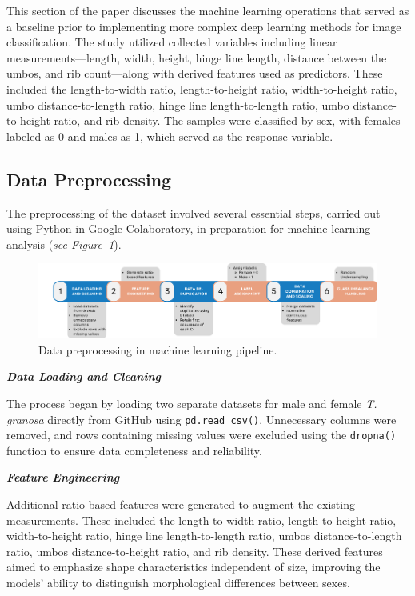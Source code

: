 This section of the paper discusses the machine learning operations that served as a baseline prior to implementing more complex deep learning methods for image classification. The study utilized collected variables including linear measurements—length, width, height, hinge line length, distance between the umbos, and rib count—along with derived features used as predictors. These included the length-to-width ratio, length-to-height ratio, width-to-height ratio, umbo distance-to-length ratio, hinge line length-to-length ratio, umbo distance-to-height ratio, and rib density. The samples were classified by sex, with females labeled as 0 and males as 1, which served as the response variable.

\newpage
\subsection{Data Preprocessing}
\label{sec:pre-processing}

The preprocessing of the dataset involved several essential steps, carried out using Python in Google Colaboratory, in preparation for machine learning analysis (\textit{see Figure~\ref{fig:pipeline}}).

\begin{figure}[!htbp]
	\centering
	\includegraphics[width=1\textwidth]{figures/pipeline.png}
	\caption{Data preprocessing in machine learning pipeline.}
	\label{fig:pipeline}
\end{figure}

\textbf{\textit{Data Loading and Cleaning}}

The process began by loading two separate datasets for male and female \textit{T. granosa} directly from GitHub using \texttt{pd.read\_csv()}. Unnecessary columns were removed, and rows containing missing values were excluded using the \texttt{dropna()} function to ensure data completeness and reliability.

\textbf{\textit{Feature Engineering}}

Additional ratio-based features were generated to augment the existing measurements. These included the length-to-width ratio, length-to-height ratio, width-to-height ratio, hinge line length-to-length ratio, umbos distance-to-length ratio, umbos distance-to-height ratio, and rib density. These derived features aimed to emphasize shape characteristics independent of size, improving the models' ability to distinguish morphological differences between sexes.

